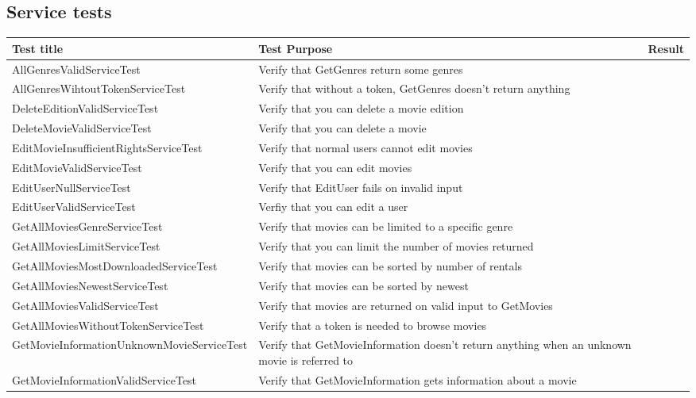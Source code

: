 \subsection{Service tests}
\label{Appendix_Test_Table_Service}
\begin{centering}
\begin{longtable}{| p{5 cm} | p{7 cm} | c |}
\hline
Test title & Test Purpose & Result\\
\hline
AllGenresValidServiceTest & Verify that GetGenres return some genres & \\
\hline
AllGenresWihtoutTokenServiceTest & Verify that without a token, GetGenres doesn't return anything & \\
\hline
DeleteEditionValidServiceTest & Verify that you can delete a movie edition & \\
\hline
DeleteMovieValidServiceTest & Verify that you can delete a movie & \\
\hline
EditMovieInsufficientRightsServiceTest & Verify that normal users cannot edit movies & \\
\hline
EditMovieValidServiceTest & Verify that you can edit movies & \\
\hline
EditUserNullServiceTest & Verify that EditUser fails on invalid input & \\
\hline
EditUserValidServiceTest & Verfiy that you can edit a user & \\
\hline
GetAllMoviesGenreServiceTest & Verify that movies can be limited to a specific genre & \\
\hline
GetAllMoviesLimitServiceTest & Verify that you can limit the number of movies returned & \\
\hline
GetAllMoviesMostDownloadedServiceTest & Verify that movies can be sorted by number of rentals & \\
\hline
GetAllMoviesNewestServiceTest & Verify that movies can be sorted by newest & \\
\hline
GetAllMoviesValidServiceTest & Verify that movies are returned on valid input to GetMovies & \\
\hline
GetAllMoviesWithoutTokenServiceTest & Verify that a token is needed to browse movies & \\
\hline
GetMovieInformationUnknownMovieServiceTest & Verify that GetMovieInformation doesn't return anything when an unknown movie is referred to & \\
\hline
GetMovieInformationValidServiceTest & Verify that GetMovieInformation gets information about a movie & \\

\end{longtable}
\end{centering}
